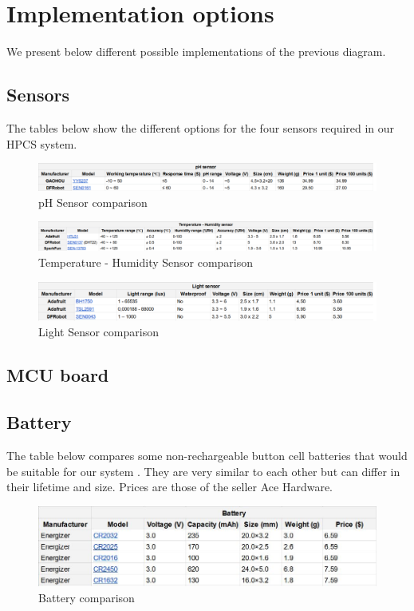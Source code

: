 \section{Implementation options}
We present below different possible implementations of the previous diagram.

\subsection{Sensors}
The tables below show the different options for the four sensors required in our HPCS system.

\begin{figure}[h]
    \includegraphics[width=\linewidth]{images/ph-sensor-comparison.png}
    \caption{pH Sensor comparison}
    \label{fig:pH Sensor Comparison}
\end{figure}

\begin{figure}[h]
    \includegraphics[width=\linewidth]{images/temp-hum-sensor-comparison.png}
    \caption{Temperature - Humidity Sensor comparison}
    \label{fig:Temperature - Humidity Sensor Comparison}
\end{figure}

\begin{figure}[h]
    \includegraphics[width=\linewidth]{images/light-sensor-comparison.png}
    \caption{Light Sensor comparison}
    \label{fig:Light Sensor Comparison}
\end{figure}
\subsection{MCU board}
\subsection{Battery}
The table below compares some non-rechargeable button cell batteries that would be suitable for our system \cite{b7}.
They are very similar to each other but can differ in their lifetime and size. Prices are those of the seller Ace Hardware.
\begin{figure}[h]
    \includegraphics[width=\linewidth]{images/battery-comparison.jpg}
    \caption{Battery comparison}
    \label{fig:Battery Comparison}
\end{figure}

